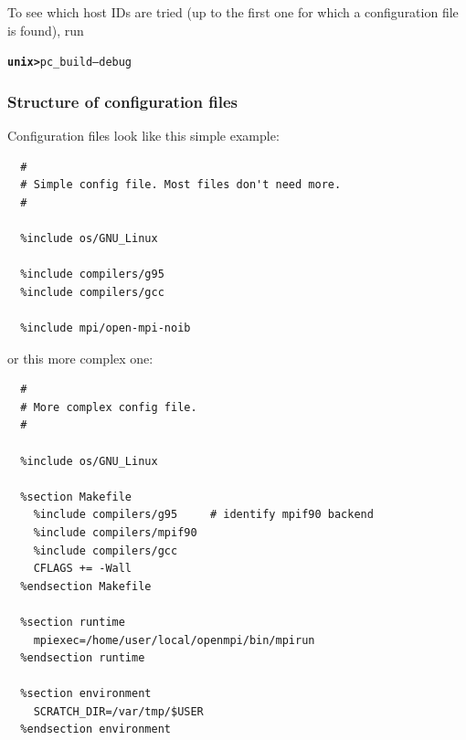 \documentclass[\mydriver,12pt,twoside,notitlepage,a4paper]{article}
\newcommand{\prompt}[1]{{\ttfamily\bfseries{}#1}}
\begin{document}
To see which host IDs are tried (up to the first one for which a
configuration file is found), run
\begin{alltt}
  \prompt{unix> } pc_build --debug
\end{alltt}


\subsubsection{Structure of configuration files}

Configuration files look like this simple example:
\begin{verbatim}
  #
  # Simple config file. Most files don't need more.
  #

  %include os/GNU_Linux

  %include compilers/g95
  %include compilers/gcc

  %include mpi/open-mpi-noib
\end{verbatim}
or this more complex one:
\begin{verbatim}
  #
  # More complex config file.
  #

  %include os/GNU_Linux

  %section Makefile
    %include compilers/g95     # identify mpif90 backend
    %include compilers/mpif90
    %include compilers/gcc
    CFLAGS += -Wall
  %endsection Makefile

  %section runtime
    mpiexec=/home/user/local/openmpi/bin/mpirun
  %endsection runtime

  %section environment
    SCRATCH_DIR=/var/tmp/$USER
  %endsection environment
\end{verbatim}
\end{document}
